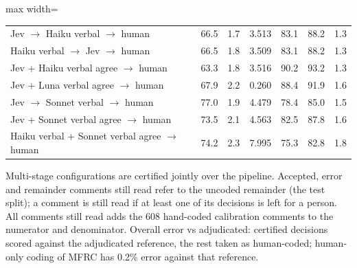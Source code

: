 \begin{table}[t]
\begin{adjustbox}{max width=\linewidth}
\begin{tabular}{lrrlrrr}
Jev $\rightarrow$ Haiku verbal $\rightarrow$ human & 66.5 & 1.7 & 3.513 & 83.1 & 88.2 & 1.3 \\
Haiku verbal $\rightarrow$ Jev $\rightarrow$ human & 66.5 & 1.8 & 3.509 & 83.1 & 88.2 & 1.3 \\
Jev + Haiku verbal agree $\rightarrow$ human & 63.3 & 1.8 & 3.516 & 90.2 & 93.2 & 1.3 \\
Jev + Luna verbal agree $\rightarrow$ human & 67.9 & 2.2 & 0.260 & 88.4 & 91.9 & 1.6 \\
Jev $\rightarrow$ Sonnet verbal $\rightarrow$ human & 77.0 & 1.9 & 4.479 & 78.4 & 85.0 & 1.5 \\
Jev + Sonnet verbal agree $\rightarrow$ human & 73.5 & 2.1 & 4.563 & 82.5 & 87.8 & 1.6 \\
Haiku verbal + Sonnet verbal agree $\rightarrow$ human & 74.2 & 2.3 & 7.995 & 75.3 & 82.8 & 1.8 \\
\bottomrule
\end{tabular}
\end{adjustbox}
\par\smallskip\footnotesize\raggedright Multi-stage configurations are certified jointly over the pipeline. Accepted, error and remainder comments still read refer to the uncoded remainder (the test split); a comment is still read if at least one of its decisions is left for a person. All comments still read adds the 608 hand-coded calibration comments to the numerator and denominator. Overall error vs adjudicated: certified decisions scored against the adjudicated reference, the rest taken as human-coded; human-only coding of MFRC has 0.2\% error against that reference.
\end{table}

